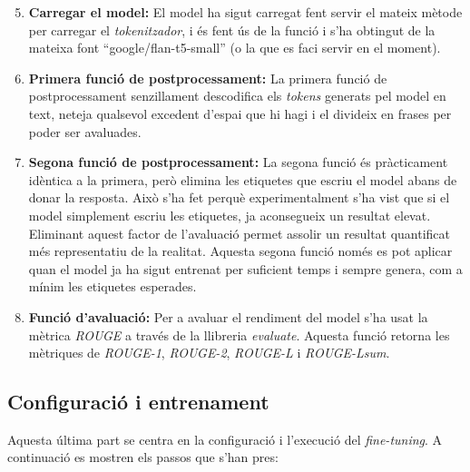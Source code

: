 \begin{enumerate}
    \setcounter{enumi}{4}
    \item \textbf{Carregar el model:} El model ha sigut carregat fent servir el mateix mètode per carregar el \textit{tokenitzador}, i és fent ús de la funció  i s'ha obtingut de la mateixa font ``google/flan-t5-small'' (o la que es faci servir en el moment).
    \item \textbf{Primera funció de postprocessament:} La primera funció de postprocessament senzillament descodifica els \textit{tokens} generats pel model en text, neteja qualsevol excedent d'espai que hi hagi i el divideix en frases per poder ser avaluades.
    \item \textbf{Segona funció de postprocessament:} La segona funció és pràcticament idèntica a la primera, però elimina les etiquetes que escriu el model abans de donar la resposta. Això s'ha fet perquè experimentalment s'ha vist que si el model simplement escriu les etiquetes, ja aconsegueix un resultat elevat. Eliminant aquest factor de l'avaluació permet assolir un resultat quantificat més representatiu de la realitat. Aquesta segona funció només es pot aplicar quan el model ja ha sigut entrenat per suficient temps i sempre genera, com a mínim les etiquetes esperades.
    \item \textbf{Funció d'avaluació:} Per a avaluar el rendiment del model s'ha usat la mètrica \textit{ROUGE} a través de la llibreria \textit{evaluate}. Aquesta funció retorna les mètriques de \textit{ROUGE-1}, \textit{ROUGE-2}, \textit{ROUGE-L} i \textit{ROUGE-Lsum}.
\end{enumerate}


\subsection{Configuració i entrenament}
Aquesta última part se centra en la configuració i l'execució del \textit{fine-tuning}. A continuació es mostren els passos que s'han pres:

